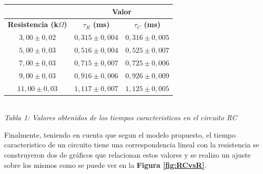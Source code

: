 \documentclass[11pt,a4paper]{article}
\begin{document}
\begin{center}
\begin{tabular}{||c|c|c||}
\hline
& \multicolumn{2}{c||}{\textbf{Valor}} \\ \hline
\textbf{Resistencia (k$\Omega$)} & \textbf{$\tau_{R}$ (ms)} & \textbf{$\tau_{C}$ (ms)} \\ \hline 
$3,00\pm0,02$ & $0,315 \pm 0,004$ & $0,316 \pm 0,005$ \\ \hline 
$5,00\pm0,03$ & $0,516\pm 0,004$ & $0,525 \pm 0,007$ \\ \hline 
$7,00\pm0,03$ & $0,715\pm 0,007$ & $0,725\pm 0,006$ \\ \hline 
$9,00\pm0,03$ & $0,916 \pm 0,006$ & $0,926 \pm 0,009$ \\ \hline 
$11,00\pm0,03$ & $1,117\pm 0,007$ & $1,125\pm 0,005$ \\ \hline 
\end{tabular}\\[0.3cm]
 
\textit{Tabla 1: Valores obtenidos de los tiempos caracteristicos en el circuito RC}
\end{center}

Finalmente, teniendo en cuenta que segun el modelo propuesto, el tiempo caracteristico de un circuito tiene una correspondencia lineal con la resistencia se construyeron dos de gráficos que relacionan estos valores y se realizo un ajuste sobre los mismos como se puede ver en la \textbf{Figura \ref{fig:RCvsR}}.
\end{document}
